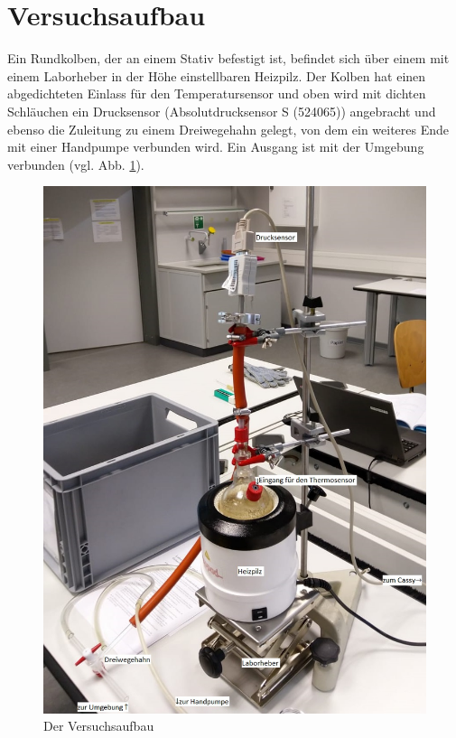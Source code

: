 \documentclass[]{article}
\begin{document}
\section{Versuchsaufbau}
Ein Rundkolben, der an einem Stativ befestigt ist, befindet sich über einem mit einem Laborheber in der Höhe einstellbaren Heizpilz. Der Kolben hat einen abgedichteten Einlass für den Temperatursensor und oben wird mit dichten Schläuchen ein Drucksensor (Absolutdrucksensor S (524065)) angebracht und ebenso die Zuleitung zu einem Dreiwegehahn gelegt, von dem ein weiteres Ende mit einer Handpumpe verbunden wird. Ein Ausgang ist mit der Umgebung verbunden (vgl. Abb. \ref{Aufbau}).
\begin{figure}
	\begin{center}
		\includegraphics[scale=0.85]{Images/Aufbau.jpg}
		\caption{Der Versuchsaufbau}
		\label{Aufbau}
	\end{center}
\end{figure}
\end{document}
